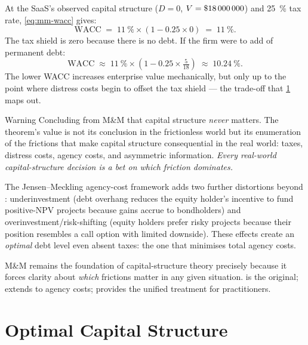 \begin{example}
At the SaaS's observed capital structure (\(D=0\), \(V=\$\num{18000000}\)) and
\qty{25}{\percent} tax rate, \cref{eq:mm-wacc} gives:
\[
  \mathrm{WACC} \;=\; \qty{11}{\percent}\times(1-0.25\times0) \;=\; \qty{11}{\percent}.
\]
The tax shield is zero because there is no debt. If the firm were to add
 of permanent debt:
\[
  \mathrm{WACC} \;\approx\; \qty{11}{\percent}\times\!\left(1-0.25\times\tfrac{5}{18}\right)
               \;\approx\; \qty{10.24}{\percent}.
\]
The lower WACC increases enterprise value mechanically, but only up to the point
where distress costs begin to offset the tax shield --- the trade-off that
\cref{sec:optimal-capital-structure} maps out.
\end{example}

\begin{admonition}{Warning}
Concluding from M\&M that capital structure \emph{never} matters. The theorem's
value is not its conclusion in the frictionless world but its enumeration of the
frictions that make capital structure consequential in the real world: taxes,
distress costs, agency costs, and asymmetric information. \emph{Every real-world
capital-structure decision is a bet on which friction dominates.}
\end{admonition}

The Jensen--Meckling agency-cost framework adds two further distortions beyond
\textcite{modigliani1958capital}: underinvestment (debt overhang reduces the equity
holder's incentive to fund positive-NPV projects because gains accrue to bondholders) and
overinvestment/risk-shifting (equity holders prefer risky projects because their position
resembles a call option with limited downside). These effects create an \emph{optimal} debt
level even absent taxes: the one that minimises total agency costs.

M\&M remains the foundation of capital-structure theory precisely because it forces clarity
about \emph{which} frictions matter in any given situation. \textcite{modigliani1958capital}
is the original; \textcite{jensen1976agency} extends to agency costs; \textcite{brealey2020}
provides the unified treatment for practitioners.

\section{Optimal Capital Structure}\label{sec:optimal-capital-structure}

